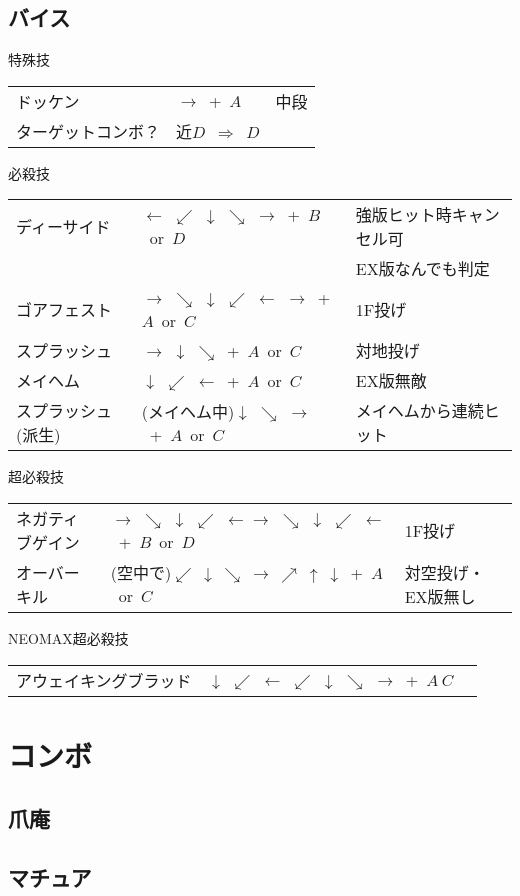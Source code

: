 \documentclass[a4j,11pt]{jarticle}
\def\hado{$\downarrow$ $\searrow$ $\rightarrow$}%
\def\tatsu{$\downarrow$ $\swarrow$ $\leftarrow$}%
\def\syoryu{$\rightarrow$ $\downarrow$ $\searrow$}%
\def\yoga{$\leftarrow$ $\swarrow$ $\downarrow$ $\searrow$ $\rightarrow$}%
\def\gyakuyoga{$\rightarrow$ $\searrow$ $\downarrow$ $\swarrow$ $\leftarrow$}%
\def\tenti{$\rightarrow$ $\searrow$ $\downarrow$ $\swarrow$ $\leftarrow$ $\rightarrow$}%
\def\orochi{$\downarrow$ $\swarrow$ $\leftarrow$ $\swarrow$ $\downarrow$ $\searrow$ $\rightarrow$}%
\def\Cancel{$\Longrightarrow$}
\begin{document}
\subsection{バイス}
\begin{itembox}[l]{特殊技}
\begin{tabular}{lll}
ドッケン&$\rightarrow$\ +\ $A$&中段\\%
ターゲットコンボ？&近$D$\ \Cancel\ $D$&%
\end{tabular}
\end{itembox}
\begin{itembox}[l]{必殺技}
\begin{tabular}{lll}
ディーサイド&\yoga\ +\ $B$\ or\ $D$&強版ヒット時キャンセル可\\
&&EX版なんでも判定\\%
ゴアフェスト&\tenti\ +\ $A$\ or\ $C$&1F投げ\\%
スプラッシュ&\syoryu\ +\ $A$\ or\ $C$&対地投げ\\%
メイヘム&\tatsu\ +\ $A$\ or\ $C$&EX版無敵\\%
スプラッシュ(派生)&(メイヘム中)\hado\ +\ $A$\ or\ $C$&メイヘムから連続ヒット%
\end{tabular}
\end{itembox}
\begin{itembox}[l]{超必殺技}
\begin{tabular}{lll}
ネガティブゲイン&\gyakuyoga\gyakuyoga\ +\ $B$\ or\ $D$&1F投げ\\%
オーバーキル&(空中で)$\swarrow\ \downarrow\ \searrow\ \rightarrow\ \nearrow\ \uparrow\
\downarrow$\ +\ $A$\ or\ $C$&対空投げ・EX版無し%
\end{tabular}
\end{itembox}
\begin{itembox}[l]{NEOMAX超必殺技}
\begin{tabular}{lll}
アウェイキングブラッド&\orochi\ +\ $A\ C$&%
\end{tabular}
\end{itembox}
\newpage
\section{コンボ}
\subsection{爪庵}
\subsection{マチュア}
\end{document}
